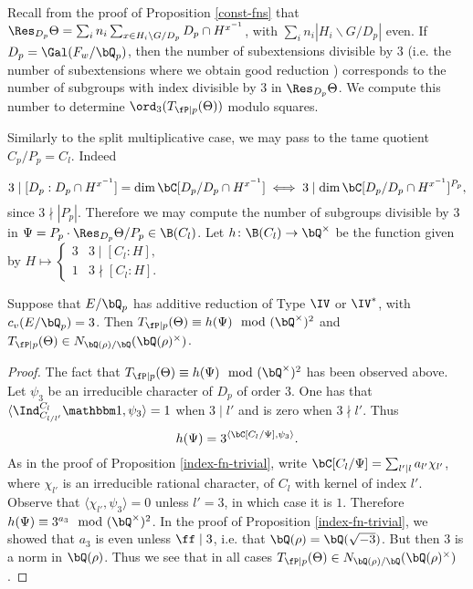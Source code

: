 
Recall from the proof of Proposition \ref{const-fns} that $\Res_{D_p} \Theta = \sum_i n_i \sum_{x \in H_i \backslash G / D_p} D_p \cap H^{x^{-1}}$, with $\sum_i n_i | H_i \backslash G / D_p|$ even. If $D_p = \Gal(F_w / \bQ_p)$, then the number of subextensions divisible by $3$ (i.e. the number of subextensions where we obtain good reduction ) corresponds to the number of subgroups with index divisible by $3$ in $\Res_{D_p}\Theta$. We compute this number to determine $\ord_3(T_{\fP \mid p}(\Theta))$ modulo squares.

Similarly to the split multiplicative case, we may pass to the tame quotient $C_p / P_p = C_l$. Indeed 

\[ 3 \mid  [D_p : D_p \cap H^{x^{-1}}] = \dim \bC [ D_p / D_p \cap H^{x^{-1}}] \iff 3 \mid \dim \bC[ D_p / D_p \cap H^{x^{-1}} ]^{P_p},\] 
since $3 \nmid|P_p|$. Therefore we may compute the number of subgroups divisible by $3$ in $\Psi = P_p \cdot \Res_{D_p} \Theta / P_p \in \B(C_l)$.  Let $h \colon \B(C_l) \to \bQ^{\times}$ be the function given by $H \mapsto \begin{cases} 3 & 3 \mid [C_l : H], \\ 1 & 3 \nmid [C_l : H]. \end{cases}$

\begin{prop}
   Suppose that $E / \bQ_p$ has additive reduction of Type $\IV$ or $\IV^*$, with $c_v(E / \bQ_p) = 3$.  Then $T_{\fP \mid p}(\Theta) \equiv h(\Psi) \mod (\bQ^{\times})^2$ and $T_{\fP \mid p}(\Theta) \in \fieldnorm{\rho}$. 
\end{prop}

\begin{proof}
The fact that $T_{\fP \mid p}(\Theta) \equiv h(\Psi) \mod (\bQ^{\times})^2$ has been observed above.
Let $\psi_3$ be an irreducible character of $D_p$ of order $3$. One has that $ \langle \Ind_{C_{l / l'}}^{C_l} \trivial , \psi_3 \rangle =  1$ when $3 \mid l'$ and is zero when  $3 \nmid l'$. 
Thus $$h(\Psi) = 3^{\langle \bC[C_l / \Psi], \psi_3 \rangle}.$$ As in the proof of Proposition \ref{index-fn-trivial}, write $\bC[C_l / \Psi] = \sum_{l' \mid l} a_{l'} \chi_{l'}$, where $\chi_{l'}$ is an irreducible rational character, of $C_l$ with kernel of index $l'$. Observe that $\langle \chi_{l'}, \psi_3 \rangle = 0$ unless $l' = 3$, in which case it is $1$. Therefore $h(\Psi) \equiv 3^{a_3} \mod (\bQ^{\times})^2$. In the proof of Proposition \ref{index-fn-trivial}, we showed that $a_3$ is even unless $\ff \mid 3$,  i.e. that $\bQ(\rho) = \bQ(\sqrt{-3})$. But then $3$ is a norm in $\bQ(\rho)$. Thus we see that in all cases $T_{\fP \mid p}(\Theta) \in N_{\bQ(\rho) / \bQ}(\bQ(\rho)^{\times})$. 
\end{proof}

